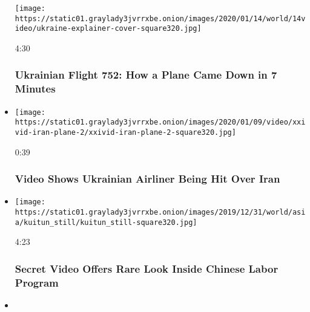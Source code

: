 \begin{itemize}
  \texttt{[image: https://static01.graylady3jvrrxbe.onion/images/2020/01/14/world/14video/ukraine-explainer-cover-square320.jpg]}

  4:30

  \hypertarget{ukrainian-flight-752-how-a-plane-came-down-in-7-minutes}{%
  \subsubsection{Ukrainian Flight 752: How a Plane Came Down in 7
  Minutes}\label{ukrainian-flight-752-how-a-plane-came-down-in-7-minutes}}
\item
  \href{https://www.nytimes3xbfgragh.onion/video/world/middleeast/100000006911815/iran-plane-missile.html?action=click\&module=video-series-bar\&region=header\&pgtype=Article\&playlistId=video/investigations}{}

  \texttt{[image: https://static01.graylady3jvrrxbe.onion/images/2020/01/09/video/xxivid-iran-plane-2/xxivid-iran-plane-2-square320.jpg]}

  0:39

  \hypertarget{video-shows-ukrainian-airliner-being-hit-over-iran}{%
  \subsubsection{Video Shows Ukrainian Airliner Being Hit Over
  Iran}\label{video-shows-ukrainian-airliner-being-hit-over-iran}}
\item
  \href{https://www.nytimes3xbfgragh.onion/video/world/asia/100000006874372/chinese-labor-uighurs.html?action=click\&module=video-series-bar\&region=header\&pgtype=Article\&playlistId=video/investigations}{}

  \texttt{[image: https://static01.graylady3jvrrxbe.onion/images/2019/12/31/world/asia/kuitun\_still/kuitun\_still-square320.jpg]}

  4:23

  \hypertarget{secret-video-offers-rare-look-inside-chinese-labor-program}{%
  \subsubsection{Secret Video Offers Rare Look Inside Chinese Labor
  Program}\label{secret-video-offers-rare-look-inside-chinese-labor-program}}
\item
  \href{https://www.nytimes3xbfgragh.onion/video/world/asia/100000006877279/india-protests-police.html?action=click\&module=video-series-bar\&region=header\&pgtype=Article\&playlistId=video/investigations}{}


\end{itemize}
